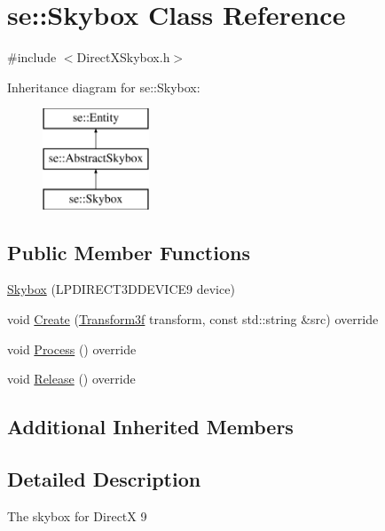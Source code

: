 \hypertarget{classse_1_1_skybox}{}\section{se\+:\+:Skybox Class Reference}
\label{classse_1_1_skybox}


{\ttfamily \#include $<$Direct\+X\+Skybox.\+h$>$}

Inheritance diagram for se\+:\+:Skybox\+:\begin{figure}[H]
\begin{center}
\leavevmode
\includegraphics[height=3.000000cm]{classse_1_1_skybox}
\end{center}
\end{figure}
\subsection*{Public Member Functions}
\begin{DoxyCompactItemize}
\item 
\mbox{\hyperlink{classse_1_1_skybox_ab6b8fd8dbbf0251f32880d501bb892c3}{Skybox}} (L\+P\+D\+I\+R\+E\+C\+T3\+D\+D\+E\+V\+I\+C\+E9 device)
\item 
void \mbox{\hyperlink{classse_1_1_skybox_a224bf849fd73b70f59613ebd572fd2ff}{Create}} (\mbox{\hyperlink{classse_1_1_transform3f}{Transform3f}} transform, const std\+::string \&src) override
\item 
void \mbox{\hyperlink{classse_1_1_skybox_acd2b0707c02b2a9ac48bcdd79608801c}{Process}} () override
\item 
void \mbox{\hyperlink{classse_1_1_skybox_ad9a6b80274236240aba6eaafaf7d2e9c}{Release}} () override
\end{DoxyCompactItemize}
\subsection*{Additional Inherited Members}


\subsection{Detailed Description}
The skybox for DirectX 9 

